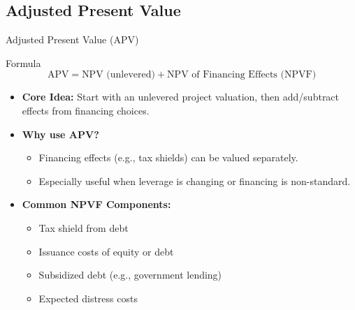 \subsection{Adjusted Present Value}
\begin{frame}{Adjusted Present Value (APV)}
	
	\begin{block}{Formula}
		\[
		\text{APV} = \text{NPV (unlevered)} + \text{NPV of Financing Effects (NPVF)}
		\]
	\end{block}
	
	\begin{itemize}
		\item \textbf{Core Idea:}  
		Start with an unlevered project valuation, then add/subtract effects from financing choices.
		
		\item \textbf{Why use APV?}
		\begin{itemize}
			\item Financing effects (e.g., tax shields) can be valued separately.
			\item Especially useful when leverage is changing or financing is non-standard.
		\end{itemize}
		
		\item \textbf{Common NPVF Components:}
		\begin{itemize}
			\item Tax shield from debt
			\item Issuance costs of equity or debt
			\item Subsidized debt (e.g., government lending)
			\item Expected distress costs
		\end{itemize}
	\end{itemize}
	
\end{frame}
